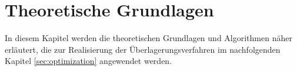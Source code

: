 \chapter{Theoretische Grundlagen} \label{sec:algorithms}

In diesem Kapitel werden die theoretischen Grundlagen und Algorithmen näher erläutert, die zur Realisierung der Überlagerungsverfahren im nachfolgenden Kapitel \ref{sec:optimization} angewendet werden. 










